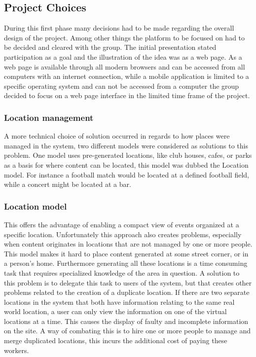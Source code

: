 \subsection{Project Choices}
\label{subsec:PrelimWorkChoices}

During this first phase many decisions had to be made regarding the overall design of the project. Among other things the platform to be focused on had to be decided and cleared with the group. The initial presentation stated participation as a goal and the illustration of the idea was as a web page. As a web page is available through all modern browsers and can be accessed from all computers with an internet connection, while a mobile application is limited to a specific operating system and can not be accessed from a computer the group decided to focus on a web page interface in the limited time frame of the project.


\subsubsection{Location management}
A more technical choice of solution occurred in regards to how places were managed in the system, two different models were considered as solutions to this problem. One model uses pre-generated locations, like club houses, cafes, or parks as a basis for where content can be located, this model was dubbed the Location model. For instance a football match would be located at a defined football field, while a concert might be located at a bar.

\subsubsection{Location model}
This offers the advantage of enabling a compact view of events organized at a specific location. Unfortunately this approach also creates problems, especially when content originates in locations that are not managed by one or more people. This model makes it hard to place content generated at some street corner, or in a person's home. Furthermore generating all these locations is a time consuming task that requires specialized knowledge of the area in question. A solution to this problem is to delegate this task to users of the system, but that creates other problems related to the creation of a duplicate location. If there are two separate locations in the system that both have information relating to the same real world location, a user can only view the information on one of the virtual locations at a time. This causes the display of faulty and incomplete information on the site. A way of combating this is to hire one or more people to manage and merge duplicated locations, this incurs the additional cost of paying these workers.


